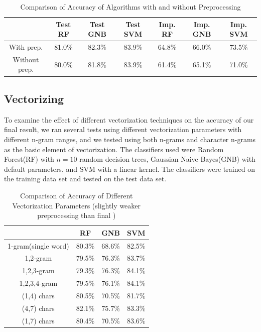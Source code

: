 \documentclass[11pt]{article}
\begin{document}
\begin{table}[h]
    \centering
    \begin{tabular}{|c| c c c c c c|} 
    \hline
     &Test RF &Test GNB &Test SVM &Imp. RF &Imp. GNB &Imp. SVM \\ [0.5ex] 
    \hline
    With prep. & 81.0\% & 82.3\% & 83.9\% & 64.8\% & 66.0\% & 73.5\% \\ 
    \hline
    Without prep. & 80.0\% & 81.8\% & 83.9\% & 61.4\% & 65.1\% & 71.0\% \\ 
    \hline
    \end{tabular}
    \caption{Comparison of Accuracy of Algorithms with and without Preprocessing}
\end{table}
              
\subsection{Vectorizing}

To examine the effect of different vectorization techniques on the accuracy of
our final result, we ran several tests using different vectorization parameters
with different n-gram ranges, and we tested using both n-grams and character
n-grams as the basic element of vectorization. The classifiers used were Random
Forest(RF) with $n = 10$ random decision trees, Gaussian Naive Bayes(GNB) with
default parameters, and SVM with a linear kernel. The classifiers were trained
on the training data set and tested on the test data set.

\begin{table}[h]
    \centering
    \begin{tabular}{|c| c c c|} 
    \hline
     & RF & GNB & SVM \\ [0.5ex] 
    \hline
    1-gram(single word) & 80.3\% &68.6\% & 82.5\%\\ 
    \hline
    1,2-gram & 79.5\% & 76.3\% & 83.7\% \\
    \hline
    1,2,3-gram&79.3\%&76.3\%&84.1\% \\
    \hline
    1,2,3,4-gram&79.5\%&76.1\%&84.1\% \\
    \hline\hline
    (1,4) chars&80.5\%&70.5\%&81.7\% \\ 
    \hline
    (4,7) chars&82.1\%&75.7\%&83.3\% \\
    \hline
    (1,7) chars&80.4\%&70.5\%&83.6\% \\ 
    \hline
    \end{tabular}
    \caption{Comparison of Accuracy of Different Vectorization Parameters (slightly
              weaker preprocessing than final )}
\end{table}
\end{document}
